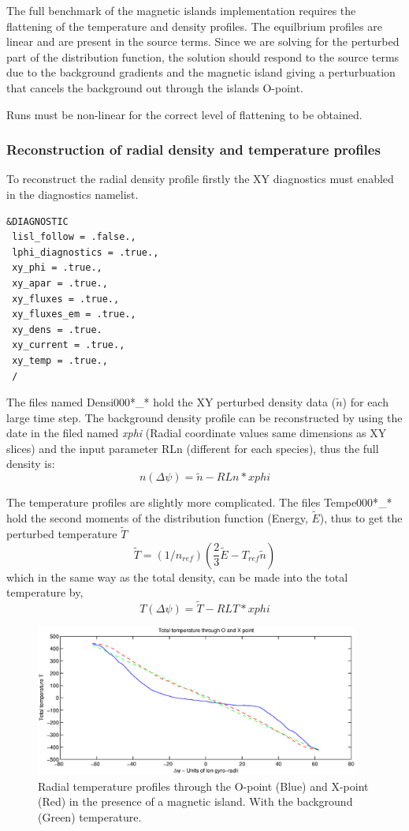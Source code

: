 \documentclass{report}
\def\be{\begin{equation}}
\def\ee{\end{equation}}
\begin{document}
The full benchmark of the magnetic islands implementation requires the flattening of the temperature and density profiles.  The equilbrium profiles are linear and are present in the source terms.  Since we are solving for the perturbed part of the distribution function, the solution should respond to the source terms due to the background gradients and the magnetic island giving a perturbuation that cancels the background out through the islands O-point.

Runs must be non-linear for the correct level of flattening to be obtained.

\subsubsection{Reconstruction of radial density and temperature profiles}

To reconstruct the radial density profile firstly the XY diagnostics must enabled in the diagnostics namelist.

\begin{verbatim}
&DIAGNOSTIC
 lisl_follow = .false.,
 lphi_diagnostics = .true.,
 xy_phi = .true.,
 xy_apar = .true.,
 xy_fluxes = .true.,
 xy_fluxes_em = .true.,
 xy_dens = .true.
 xy_current = .true.,
 xy_temp = .true.,
 / 
\end{verbatim}

The files named Densi000*\_* hold the XY perturbed density data ($\tilde{n}$) for each large time step.  The background density profile can be reconstructed by using the date in the filed named {\it xphi} (Radial coordinate values same dimensions as XY slices) and the input parameter RLn (different for each species), thus the full density is:
\be
n({\Delta\psi}) = \tilde{n} - RLn*xphi
\ee

The temperature profiles are slightly more complicated.  The files Tempe000*\_* hold the second moments of the distribution function (Energy, $\tilde{E}$), thus to get the perturbed temperature $\tilde{T}$ 
\be
\tilde{T} = (1/n_{ref})(\frac{2}{3}\tilde{E} - T_{ref}\tilde{n})
\ee
which in the same way as the total density, can be made into the total temperature by,
\be
T({\Delta\psi}) = \tilde{T} - RLT*xphi
\ee

\begin{figure}
\begin{center}
\includegraphics[width=0.95\textwidth]{tempflat.eps}
\caption{Radial temperature profiles through the O-point (Blue) and X-point (Red) in the presence of a magnetic island.  With the background (Green) temperature.}
\end{center}
\end{figure}
\end{document}
